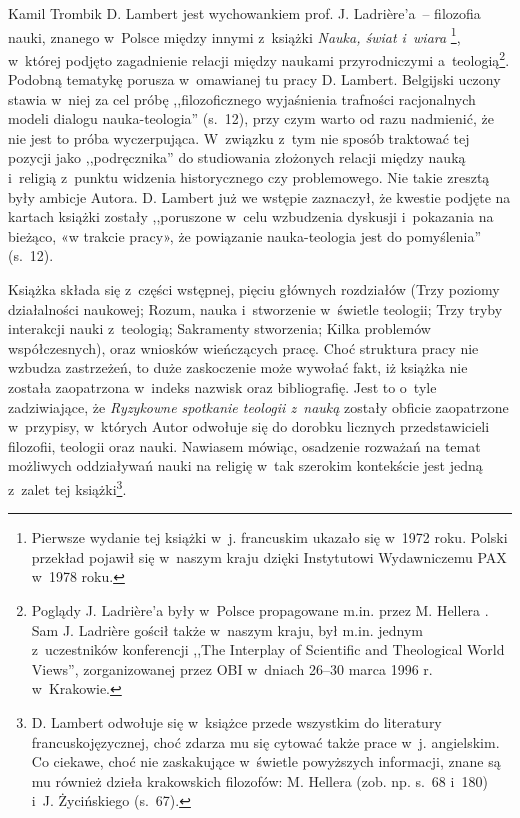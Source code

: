 \begin{recplenv}{Kamil Trombik}
D. Lambert jest wychowankiem prof. J. Ladrière’a~-- filozofia nauki, znanego w~Polsce między innymi z~książki
\textit{Nauka, świat i~wiara}
\parencite{ladriere_nauka_1978}\footnote{Pierwsze wydanie tej książki w~j.
francuskim ukazało się w~1972 roku. Polski przekład pojawił się w~naszym kraju dzięki Instytutowi
Wydawniczemu PAX w~1978 roku. }, w~której podjęto zagadnienie relacji między naukami przyrodniczymi a~teologią\footnote{Poglądy J.
Ladrière’a były w~Polsce propagowane m.in. przez M. Hellera
\parencite*{heller_wyzwanie_1978}.
Sam J. Ladrière gościł
także w~naszym kraju, był m.in. jednym z~uczestników konferencji ,,The Interplay of Scientific and Theological World
Views'', zorganizowanej przez OBI w~dniach 26–30 marca 1996 r. w~Krakowie.}. Podobną tematykę porusza w~omawianej tu
pracy D. Lambert. Belgijski uczony stawia w~niej za cel próbę ,,filozoficznego wyjaśnienia trafności racjonalnych modeli
dialogu nauka-teologia'' (s.~12), przy czym warto od razu nadmienić, że nie jest to próba wyczerpująca. W~związku z~tym
nie sposób traktować tej pozycji jako ,,podręcznika'' do studiowania złożonych relacji między nauką i~religią z~punktu
widzenia historycznego czy problemowego. Nie takie zresztą były ambicje Autora. D. Lambert już we wstępie zaznaczył, że
kwestie podjęte na kartach książki zostały ,,poruszone w~celu wzbudzenia dyskusji i~pokazania na bieżąco, «w trakcie
pracy», że powiązanie nauka-teologia jest do pomyślenia'' (s.~12).

Książka składa się z~części wstępnej, pięciu głównych rozdziałów (Trzy poziomy działalności naukowej; Rozum,
nauka i~stworzenie w~świetle teologii; Trzy tryby interakcji nauki z~teologią; Sakramenty stworzenia; Kilka problemów
współczesnych), oraz wniosków wieńczących pracę. Choć struktura pracy nie wzbudza zastrzeżeń, to duże zaskoczenie może
wywołać fakt, iż książka nie została zaopatrzona w~indeks nazwisk oraz bibliografię. Jest to o~tyle zadziwiające, że
\textit{Ryzykowne spotkanie teologii z~nauką} zostały obficie zaopatrzone w~przypisy, w~których Autor odwołuje się do
dorobku licznych przedstawicieli filozofii, teologii oraz nauki. Nawiasem mówiąc, osadzenie rozważań na temat możliwych
oddziaływań nauki na religię w~tak szerokim kontekście jest jedną z~zalet tej książki\footnote{D. Lambert odwołuje
się w~książce przede wszystkim do literatury francuskojęzycznej, choć zdarza mu się cytować także prace w~j. angielskim. Co
ciekawe, choć nie zaskakujące w~świetle powyższych informacji, znane są mu również dzieła krakowskich
filozofów: M. Hellera (zob. np. s.~68 i~180) i~J. Życińskiego (s.~67).}. 


\end{recplenv}
